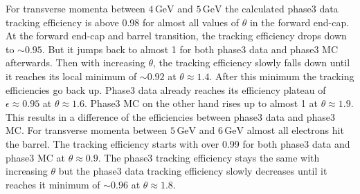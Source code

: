 \documentclass[a4paper,11pt,twosided,final,german,openbib,pdftex,listof=totoc,bibliography=totoc]{scrbook}
\begin{document}
For transverse momenta between $4\,\textrm{GeV}$ and $5\,\textrm{GeV}$ the calculated phase3 data tracking efficiency is above 0.98 for almost all values of $\theta$ in the forward end-cap. At the forward end-cap and barrel transition, the tracking efficiency drops down to $\sim 0.95$. But it jumps back to almost 1 for both phase3 data and phase3 MC afterwards. Then with increasing $\theta$, the tracking efficiency slowly falls down until it reaches its local minimum of $\sim 0.92$ at $\theta \approx 1.4$. After this minimum the tracking efficiencies go back up. Phase3 data already reaches its efficiency plateau of $\epsilon \approx 0.95 $ at $\theta \approx 1.6$. Phase3 MC on the other hand rises up to  almost 1 at $\theta \approx 1.9$. This results in a difference of the efficiencies between phase3 data and phase3 MC.
For transverse momenta between $5\,\textrm{GeV}$ and $6\,\textrm{GeV}$ almost all electrons hit the barrel. The tracking efficiency starts with over 0.99 for both phase3 data and phase3 MC at $\theta \approx 0.9$. The phase3 tracking efficiency stays the same with increasing $\theta$ but the phase3 data tracking efficiency slowly decreases until it reaches it minimum of $\sim 0.96$ at $\theta \approx 1.8$.
\end{document}
